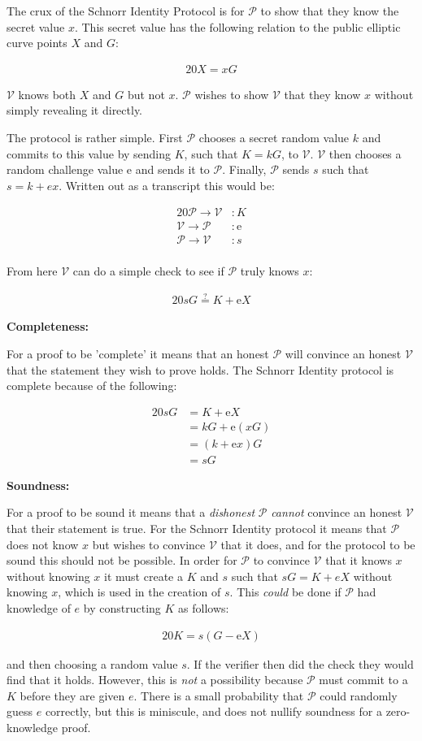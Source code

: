 \documentclass{article}
\newcommand{\eq}[1]{\begin{alignat*}{20}#1\end{alignat*}}
\newcommand{\ran}[1]{\mathrm{#1}}
\newcommand{\V}{\mathcal{V}}
\renewcommand{\P}{\mathcal{P}}
\begin{document}
The crux of the Schnorr Identity Protocol is for $\P$ to show that
they know the secret value $x$. This secret value has the following
relation to the public elliptic curve points $X$ and $G$:

\eq{
	X = xG
}

$\V$ knows both $X$ and $G$ but not $x$. $\P$ wishes to show $\V$ that 
they know $x$ without simply revealing it directly.

The protocol is rather simple. First $\P$ chooses a secret random
value $k$ and commits to this value by sending $K$, such that $K =
kG$, to $\V$. $\V$ then chooses a random challenge value $\ran{e}$
and sends it to $\P$. Finally, $\P$ sends $s$ such that $s = k +
ex$. Written out as a transcript this would be:

\eq{
	\P \rightarrow \V &: K \\
	\V \rightarrow \P &: \ran{e} \\
	\P \rightarrow \V &: s \\
}

From here $\V$ can do a simple check to see if $\P$ truly knows $x$:

\eq{
	sG \stackrel{?}{=} K + \ran{e}X
}


\textbf{Completeness:}

For a proof to be 'complete' it means that an honest $\P$ will convince
an honest $\V$ that the statement they wish to prove holds. The Schnorr 
Identity protocol is complete because of the following:

\eq{
	sG &= K + \ran{e}X \\
	   &= kG + \ran{e}(xG) \\
	   &= (k + \ran{e}x)G \\
	   &= sG
}

\textbf{Soundness:}

For a proof to be sound it means that a \textit{dishonest} $\P$
\textit{cannot} convince an honest $\V$ that their statement is
true. For the Schnorr Identity protocol it means that $\P$ does not know
$x$ but wishes to convince $\V$ that it does, and for the protocol to
be sound this should not be possible. In order for $\P$ to convince
$\V$ that it knows $x$ without knowing $x$ it must create a $K$ and
$s$ such that $sG = K + eX$ without knowing $x$, which is used in the
creation of $s$. This \textit{could} be done if $\P$ had knowledge of
$e$ by constructing $K$ as follows:

\eq{
	K = s(G - \ran{e}X)
}

and then choosing a random value $s$. If the verifier then did the
check they would find that it holds. However, this is \textit{not}
a possibility because $\P$ must commit to a $K$ before they are given
$e$. There is a small probability that $\P$ could randomly guess $e$
correctly, but this is miniscule, and does not nullify soundness for
a zero-knowledge proof.
\end{document}
